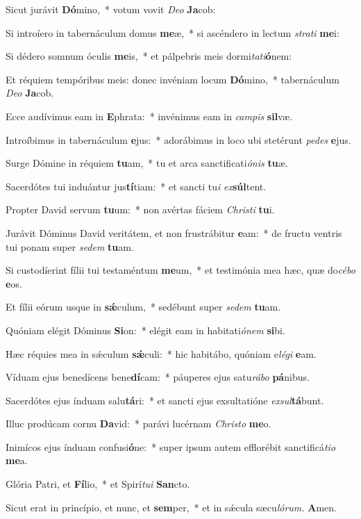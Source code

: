 \item Sicut jurávit \textbf{Dó}mino,~* votum vovit \textit{Deo} \textbf{Ja}cob:
\item Si introíero in tabernáculum domus \textbf{me}æ,~* si ascéndero in lectum \textit{strati} \textbf{me}i:
\item Si dédero somnum óculis \textbf{me}is,~* et pálpebris meis dormi\textit{tati}\textbf{ó}nem:
\item Et réquiem tempóribus meis: donec invéniam locum \textbf{Dó}mino,~* tabernáculum \textit{Deo} \textbf{Ja}cob.
\item Ecce audívimus eam in \textbf{E}phrata:~* invénimus eam in \textit{campis} \textbf{sil}væ.
\item Introíbimus in tabernáculum \textbf{e}jus:~* adorábimus in loco ubi stetérunt \textit{pedes} \textbf{e}jus.
\item Surge Dómine in réquiem \textbf{tu}am,~* tu et arca sanctificati\textit{ónis} \textbf{tu}æ.
\item Sacerdótes tui induántur jus\textbf{tí}tiam:~* et sancti tu\textit{i} \textit{ex}\textbf{súl}tent.
\item Propter David servum \textbf{tu}um:~* non avértas fáciem \textit{Christi} \textbf{tu}i.
\item Jurávit Dóminus David veritátem, et non frustrábitur \textbf{e}am:~* de fructu ventris tui ponam super \textit{sedem} \textbf{tu}am.
\item Si custodíerint fílii tui testaméntum \textbf{me}um,~* et testimónia mea hæc, quæ do\textit{cébo} \textbf{e}os.
\item Et fílii eórum usque in \textbf{sǽ}culum,~* sedébunt super \textit{sedem} \textbf{tu}am.
\item Quóniam elégit Dóminus \textbf{Si}on:~* elégit eam in habitati\textit{ónem} \textbf{si}bi.
\item Hæc réquies mea in sǽculum \textbf{sǽ}culi:~* hic habitábo, quóniam e\textit{légi} \textbf{e}am.
\item Víduam ejus benedícens bene\textbf{dí}cam:~* páuperes ejus satu\textit{rábo} \textbf{pá}nibus.
\item Sacerdótes ejus índuam salu\textbf{tá}ri:~* et sancti ejus exsultatióne \textit{exsul}\textbf{tá}bunt.
\item Illuc prodúcam cornu \textbf{Da}vid:~* parávi lucérnam \textit{Christo} \textbf{me}o.
\item Inimícos ejus índuam confusi\textbf{ó}ne:~* super ipsum autem efflorébit sanctificá\textit{tio} \textbf{me}a.
\item Glória Patri, et \textbf{Fí}lio,~* et Spirí\textit{tui} \textbf{San}cto.
\item Sicut erat in princípio, et nunc, et \textbf{sem}per,~* et in sǽcula sæcu\tinyhspace\textit{lórum.} \textbf{A}men.
